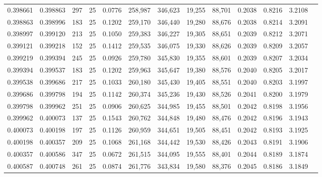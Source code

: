 \begin{tabular}{rrrrrrrrrrrrr}
0.398661 & 0.398863 &   297 &  25 &                                     0.0776 & 258,987 & 346,623 &  19,255 &  88,701 & 0.2038 & 0.8216 & 3.2108 \\
0.398863 & 0.398996 &   183 &  25 &                                     0.1202 & 259,170 & 346,440 &  19,280 &  88,676 & 0.2038 & 0.8214 & 3.2091 \\
0.398997 & 0.399120 &   213 &  25 &                                     0.1050 & 259,383 & 346,227 &  19,305 &  88,651 & 0.2039 & 0.8212 & 3.2071 \\
0.399121 & 0.399218 &   152 &  25 &                                     0.1412 & 259,535 & 346,075 &  19,330 &  88,626 & 0.2039 & 0.8209 & 3.2057 \\
0.399219 & 0.399394 &   245 &  25 &                                     0.0926 & 259,780 & 345,830 &  19,355 &  88,601 & 0.2039 & 0.8207 & 3.2034 \\
0.399394 & 0.399537 &   183 &  25 &                                     0.1202 & 259,963 & 345,647 &  19,380 &  88,576 & 0.2040 & 0.8205 & 3.2017 \\
0.399538 & 0.399686 &   217 &  25 &                                     0.1033 & 260,180 & 345,430 &  19,405 &  88,551 & 0.2040 & 0.8203 & 3.1997 \\
0.399686 & 0.399798 &   194 &  25 &                                     0.1142 & 260,374 & 345,236 &  19,430 &  88,526 & 0.2041 & 0.8200 & 3.1979 \\
0.399798 & 0.399962 &   251 &  25 &                                     0.0906 & 260,625 & 344,985 &  19,455 &  88,501 & 0.2042 & 0.8198 & 3.1956 \\
0.399962 & 0.400073 &   137 &  25 &                                     0.1543 & 260,762 & 344,848 &  19,480 &  88,476 & 0.2042 & 0.8196 & 3.1943 \\
0.400073 & 0.400198 &   197 &  25 &                                     0.1126 & 260,959 & 344,651 &  19,505 &  88,451 & 0.2042 & 0.8193 & 3.1925 \\
0.400198 & 0.400357 &   209 &  25 &                                     0.1068 & 261,168 & 344,442 &  19,530 &  88,426 & 0.2043 & 0.8191 & 3.1906 \\
0.400357 & 0.400586 &   347 &  25 &                                     0.0672 & 261,515 & 344,095 &  19,555 &  88,401 & 0.2044 & 0.8189 & 3.1874 \\
0.400587 & 0.400748 &   261 &  25 &                                     0.0874 & 261,776 & 343,834 &  19,580 &  88,376 & 0.2045 & 0.8186 & 3.1849 \\

\end{tabular}
